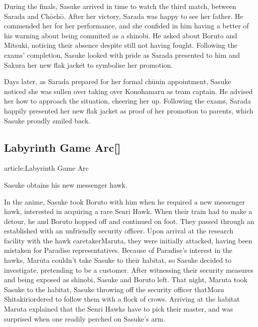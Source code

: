 \documentclass[a4paper,12pt]{article}
\begin{document}
During the finals, Sasuke arrived in time to watch the third match, between Sarada and Chōchō. After her victory, Sarada was happy to see her father. He commended her for her performance, and she confided in him having a better of his warning about being commited as a shinobi. He asked about Boruto and Mitsuki, noticing their absence despite still not having fought. Following the exams' completion, Sasuke looked with pride as Sarada presented to him and Sakura her new flak jacket to symbolise her promotion.\\ \par \vspace{0.5cm}

Days later, as Sarada prepared for her formal chūnin appointment, Sasuke noticed she was sullen over taking over Konohamaru as team captain. He advised her how to approach the situation, cheering her up. Following the exams, Sarada happily presented her new flak jacket as proof of her promotion to parents, which Sasuke proudly smiled back.\\ \par \vspace{0.5cm}

\subsection*{Labyrinth Game Arc[]}\n\nMain article:Labyrinth Game Arc\\ \par \vspace{0.5cm}

Sasuke obtains his new messenger hawk.\\ \par \vspace{0.5cm}

In the anime, Sasuke took Boruto with him when he required a new messenger hawk, interested in acquiring a rare Senri Hawk. When their train had to make a detour, he and Boruto hopped off and continued on foot. They passed through an established with an unfriendly security officer. Upon arrival at the research facility with the hawk caretakerMaruta, they were initially attacked, having been mistaken for Paradise representatives. Because of Paradise's interest in the hawks, Maruta couldn't take Sasuke to their habitat, so Sasuke decided to investigate, pretending to be a customer. After witnessing their security measures and being exposed as shinobi, Sasuke and Boruto left. That night, Maruta took Sasuke to the habitat, Sasuke throwing off the security officer thatMozu Shitakiriordered to follow them with a flock of crows. Arriving at the habitat Maruta explained that the Senri Hawks have to pick their master, and was surprised when one readily perched on Sasuke's arm.\\ \par \vspace{0.5cm}
\end{document}
